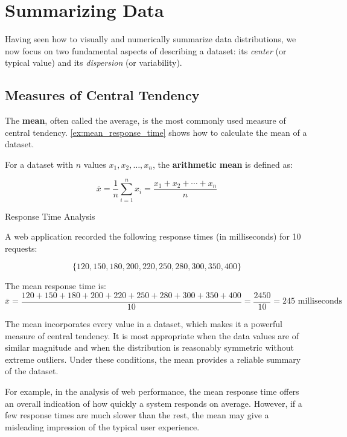 \section{Summarizing Data}
Having seen how to visually and numerically summarize data distributions, we now focus on two fundamental aspects of describing a dataset: its \emph{center} (or typical value) and its \emph{dispersion} (or variability).

\subsection*{Measures of Central Tendency}
The \textbf{mean}, often called the average, is the most commonly used measure of central tendency. \autoref{ex:mean_response_time} shows how to calculate the mean of a dataset.

\begin{definition}

For a dataset with $n$ values $x_1, x_2, \ldots, x_n$, the \textbf{arithmetic mean} is defined as:

$$
\bar{x} = \frac{1}{n}\sum_{i=1}^{n} x_i = \frac{x_1 + x_2 + \cdots + x_n}{n}
$$

\end{definition}


\begin{example} Response Time Analysis \label{ex:mean_response_time}

A web application recorded the following response times (in milliseconds) for 10 requests:

\[
\{120, 150, 180, 200, 220, 250, 280, 300, 350, 400\}
\]

The mean response time is:
\[
\bar{x} = \frac{120 + 150 + 180 + 200 + 220 + 250 + 280 + 300 + 350 + 400}{10} = \frac{2450}{10} = 245 \text{ milliseconds}
\]
\end{example}

The mean incorporates every value in a dataset, which makes it a powerful measure of central tendency. It is most appropriate when the data values are of similar magnitude and when the distribution is reasonably symmetric without extreme outliers. Under these conditions, the mean provides a reliable summary of the dataset.

For example, in the analysis of web performance, the mean response time offers an overall indication of how quickly a system responds on average. However, if a few response times are much slower than the rest, the mean may give a misleading impression of the typical user experience.

